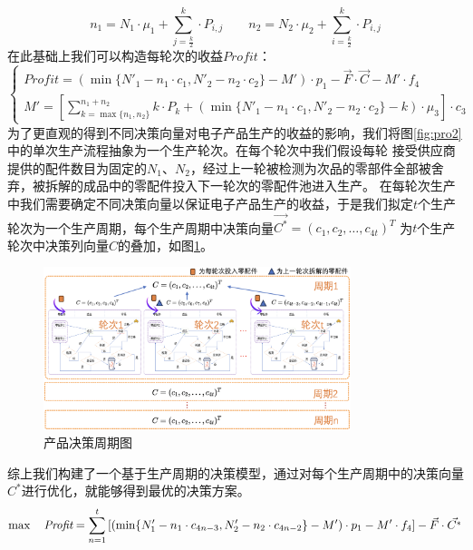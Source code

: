 \documentclass[withoutpreface,bwprint]{cumcmthesis} %
\begin{document}
\begin{equation}
	n_{1}=N_{1}\cdot \mu_{1}+\sum_{j=\frac{k}{2}}^{k}\cdot P_{i,j} \qquad
	n_{2}=N_{2}\cdot \mu_{2}+\sum_{i=\frac{k}{2}}^{k}\cdot P_{i,j}
\end{equation}
在此基础上我们可以构造每轮次的收益$Profit$：
\begin{equation}
	\left\{\begin{matrix}
		\textit{Profit}=(\min \{N'_{1}-n_{1}\cdot c_{1},N'_{2}-n_{2}\cdot c_{2}\}-M')\cdot p_{1}-\vec{F}\cdot \vec{C}-M'\cdot f_{4} \\
		M'=[\sum_{k=\max \{n_{1},n_{2}\}}^{n_{1}+n_{2}}k\cdot P_{k} + (\min \{N'_{1}-n_{1}\cdot c_{1},N'_{2}-n_{2}\cdot c_{2}\}-k)\cdot \mu_{3}]\cdot c_{3}
	\end{matrix}\right.
	\label{eq:5}
\end{equation}
为了更直观的得到不同决策向量对电子产品生产的收益的影响，我们将图\ref{fig:pro2}中的单次生产流程抽象为一个生产轮次。在每个轮次中我们假设每轮
接受供应商提供的配件数目为固定的$N_{1}$、$N_{2}$，经过上一轮被检测为次品的零部件全部被舍弃，被拆解的成品中的零配件投入下一轮次的零配件池进入生产。
在每轮次生产中我们需要确定不同决策向量以保证电子产品生产的收益，于是我们拟定$t$个生产轮次为一个生产周期，每个生产周期中决策向量$\vec{C^{*}}=(c_{1},c_{2},\dots,c_{4t})^{T}$
为$t$个生产轮次中决策列向量$C$的叠加，如图\ref{fig:pro2-2}。
\begin{figure}[H]
	\centering
	\includegraphics[width=0.8\textwidth]{Fig/pro2-2.png}
	\caption{产品决策周期图}
	\label{fig:pro2-2}
\end{figure}
综上我们构建了一个基于生产周期的决策模型，通过对每个生产周期中的决策向量$C^{*}$进行优化，就能够得到最优的决策方案。
$$	\max \quad  \textit{Profit}=\sum_{n=1}^{t}\left [  (\min \{N'_{1}-n_{1}\cdot c_{4n-3},N'_{2}-n_{2}\cdot c_{4n-2}\}-M')\cdot p_{1}-M'\cdot f_{4} \right ] -\vec{F}\cdot \vec{C^{*}}\\$$
\end{document}
